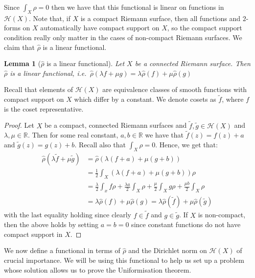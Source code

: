 \documentclass[11pt]{report}
\newtheorem{lemma}[thm]{Lemma}
\theoremstyle{definition}
\begin{document}
Since $\int_X \rho = 0$ then we have that this functional is linear on functions in $\mathcal{H}(X)$. Note that, if $X$ is a compact Riemann surface, then all functions and $2$-forms on $X$ automatically have compact support on $X$, so the compact support condition really only matter in the cases of non-compact Riemann surfaces. We claim that $\hat{\rho}$ is a linear functional.
\begin{lemma}[$\hat{\rho}$ is a linear functional]\label{rhohatlinear}
  Let $X$ be a connected Riemann surface. Then $\hat{\rho}$ is a linear functional, i.e.\ $\hat{\rho}(\lambda f+ \mu g) = \lambda \hat{\rho}(f) + \mu \hat{\rho}(g)$
\end{lemma}
Recall that elements of $\mathcal{H}(X)$ are equivalence classes of smooth functions with compact support on $X$ which differ by a constant. We denote cosets as $\tilde{f}$, where $f$ is the coset representative.
\begin{proof}
  Let $X$ be a compact, connected Riemann surfaces and $\tilde{f},\tilde{g} \in \mathcal{H}(X)$ and $\lambda,\mu \in \mathbb{R}$. Then for some real constant, $a,b \in \mathbb{R}$ we have that $\tilde{f}(z) = f(z) + a$ and $\tilde{g}(z) = g(z) + b$. Recall also that $\int_X \rho = 0$.
  Hence, we get that:
  \begin{align*}
    \hat{\rho}(\lambda \tilde{f}+ \mu \tilde{g}) &= \hat{\rho}(\lambda(f + a) + \mu(g + b)) \\
    &=\frac{1}{2}\int_X (\lambda(f + a) + \mu(g + b))\rho \\
    &=\frac{\lambda}{2} \int_x f\rho + \frac{\lambda a}{2}\int_X \rho + \frac{\mu}{2} \int_X g\rho + \frac{\mu b}{2}\int_X \rho \\
    &=\lambda \hat{\rho}(f) + \mu \hat{\rho}(g)=\lambda \hat{\rho}(\tilde{f}) + \mu \hat{\rho}(\tilde{g})
  \end{align*}
  with the last equality holding since clearly $f \in \tilde{f}$ and $g \in \tilde{g}$. If $X$ is non-compact, then the above holds by setting $a=b=0$ since constant functions do not have compact support in $X$.
\end{proof}
We now define a functional in terms of $\hat{\rho}$ and the Dirichlet norm on $\mathcal{H}(X)$ of crucial importance. We will be using this functional to help us set up a problem whose solution allows us to prove the Uniformisation theorem. 
\end{document}
